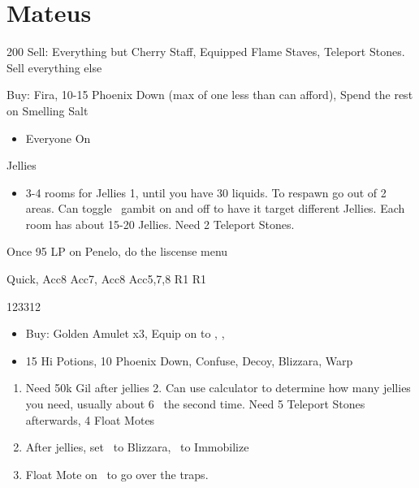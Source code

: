 \chapter{Mateus}

\begin{shop}{200}
Sell: Everything but Cherry Staff, Equipped Flame Staves, Teleport Stones. Sell everything else

Buy: Fira, 10-15 Phoenix Down (max of one less than can afford), Spend the rest on Smelling Salt
\end{shop}
\begin{gambit}
\begin{itemize}
\vaanf: Protect/Smelling Salt on Any if Brigadeen, otherwise Steal
\penelof Aero to Fira
\ashef Aero to Fira
\item Everyone On
\end{itemize}
\end{gambit}
\begin{battle}{Jellies}
\begin{itemize}
\item 3-4 rooms for Jellies 1, until you have 30 liquids. To respawn go out of 2 areas. Can toggle \ashe\ gambit on and off to have it target different Jellies. Each room has about 15-20 Jellies. Need 2 Teleport Stones.
\end{itemize}
\end{battle}
\begin{liscense}
Once 95 LP on Penelo, do the liscense menu

					Quick, Acc8
				Acc7, Acc8	
Acc5,7,8				R1	R1
\end{liscense}
\begin{shop}{123312}
\begin{itemize}
\item Buy: Golden Amulet x3, Equip on to \ashe, \vaan, \penelo
\item 15 Hi Potions, 10 Phoenix Down, Confuse, Decoy, Blizzara, Warp
\end{itemize}
\end{shop}
\begin{enumerate}
\item Need 50k Gil after jellies 2. Can use calculator to determine how many jellies you need, usually about 6~ the second time. Need 5 Teleport Stones afterwards, 4 Float Motes
\item After jellies, set \ashe\ to Blizzara, \penelo\ to Immobilize
\item Float Mote on \vaan\ to go over the traps.
\end{enumerate}
